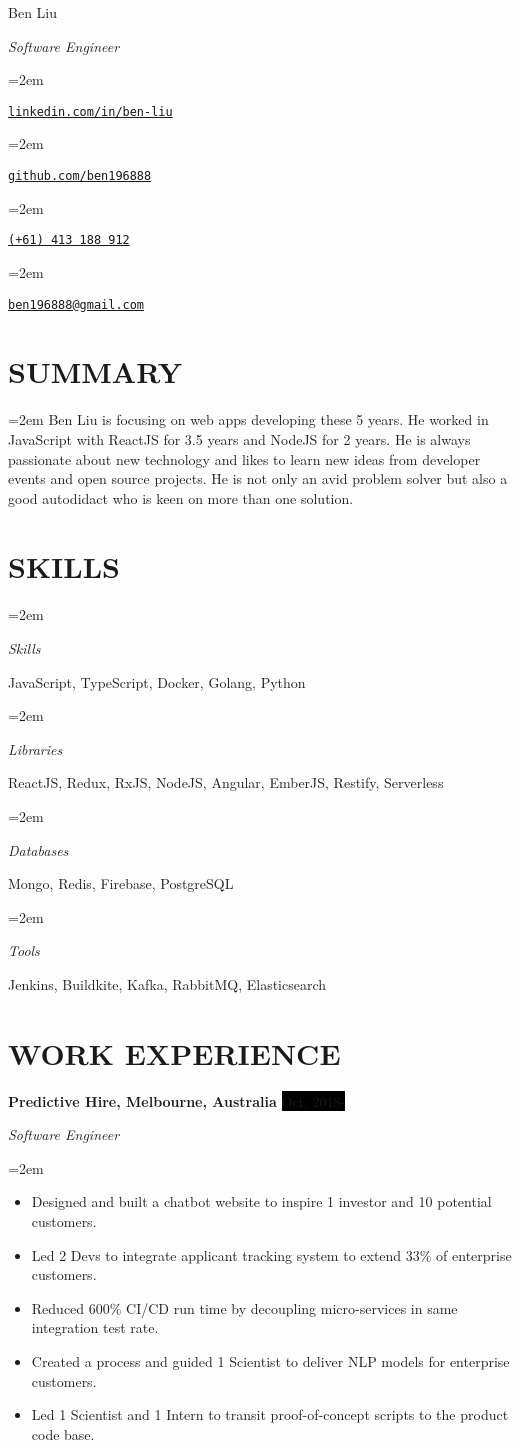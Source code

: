 \documentclass[a4paper, 11pt]{article}
\newlength{\spacebox}
\newcommand{\sepspace}{\vspace*{0.3em}}       %
\newcommand{\MyName}[1]{ %
        \noindent
		\Huge \usefont{OT1}{phv}{b}{n} #1
		\par \normalsize \normalfont}
\newcommand{\MySlogan}[1]{ %
		\noindent
		\large \usefont{OT1}{phv}{m}{n}\textit{#1}
		\par \normalsize \normalfont}
\newcommand{\NewPart}[1]{\section*{\uppercase{#1}}}
\newcommand{\PersonalEntry}[2]{
		\noindent\hangindent=2em\hangafter=0 %
		\parbox{\spacebox}{        %
		\hfill\textit{#1}}		       %
		\hfill\hspace{1.2em} #2 \par}    %
\newcommand{\SummaryEntry}[1]{
		\noindent\hangindent=2em\hangafter=0
		\noindent #1
		\normalsize \par}
\newcommand{\SkillsEntry}[2]{      %
		\noindent\hangindent=2em\hangafter=0 %
		\parbox{\spacebox}{        %
		\textit{#1}}			   %
		\hspace{1.2em} #2 \par}    %
\newcommand{\EducationEntry}[4]{
		\noindent \textbf{#1} \hfill      %
		\colorbox{White}{%
			\parbox{5cm}{%
			\hfill\color{Black}#2}} \par  %
		\noindent \textit{#3} \par        %
		\noindent\hangindent=2em\hangafter=0 \small #4 %
		\normalsize \par}
\newcommand{\WorkEntry}[4]{				  %
		\noindent \textbf{#1} \hfill      %
		\noindent\colorbox{Black}{\color{White}#2} \par  %
		\noindent \textit{#3} \par              %
		\noindent\hangindent=2em\hangafter=0 \small #4 %
		\normalsize \par}
\begin{document}
\parbox{0.35\textwidth}{
	\MyName{Ben Liu}
	\MySlogan{Software Engineer}
}
\parbox{0.6\textwidth}{

\PersonalEntry{}{\href{https://www.linkedin.com/in/ben-liu}{\texttt{linkedin.com/in/ben-liu}}}
\PersonalEntry{}{\href{https://github.com/ben196888}{\texttt{github.com/ben196888}}}
\PersonalEntry{}{\href{tel:+61-413-188-912}{\texttt{(+61) 413 188 912}}}
\PersonalEntry{}{\href{mailto:ben196888@gmail.com}{\texttt{ben196888@gmail.com}}}
}
\sepspace

\NewPart{Summary}{}

\SummaryEntry{%
Ben Liu is focusing on web apps developing these 5 years.
He worked in JavaScript with ReactJS for 3.5 years and NodeJS for 2 years.
He is always passionate about new technology and likes to learn new ideas from developer events and open source projects.
He is not only an avid problem solver but also a good autodidact who is keen on more than one solution.
}

\NewPart{Skills}{}

\SkillsEntry{Skills}    {JavaScript, TypeScript, Docker, Golang, Python}
\SkillsEntry{Libraries} {ReactJS, Redux, RxJS, NodeJS, Angular, EmberJS, Restify, Serverless}
\SkillsEntry{Databases} {Mongo, Redis, Firebase, PostgreSQL}
\SkillsEntry{Tools}     {Jenkins, Buildkite, Kafka, RabbitMQ, Elasticsearch}

\NewPart{Work Experience}{}

\WorkEntry{Predictive Hire, Melbourne, Australia}{Oct. 2018-}{Software Engineer}{
\begin{itemize}
	\item {Designed and built a chatbot website to inspire 1 investor and 10 potential customers.}
	\item {Led 2 Devs to integrate applicant tracking system to extend 33\% of enterprise customers.}
	\item {Reduced 600\% CI/CD run time by decoupling micro-services in same integration test rate.}
	\item {Created a process and guided 1 Scientist to deliver NLP models for enterprise customers.}
	\item {Led 1 Scientist and 1 Intern to transit proof-of-concept scripts to the product code base.}
\end{itemize}
}
\end{document}
